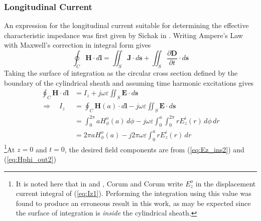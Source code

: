 \subsubsection{Longitudinal Current}
An expression for the longitudinal current suitable for determining the effective characteristic impedance was first given by Sichak in \cite{sichak1}. Writing Ampere's Law with Maxwell's correction in integral form gives
\begin{equation}
	\oint_C \mathbf{H} \cdot d\mathbf{l} = \iint_S \mathbf{J} \cdot d\mathbf{s} + \iint_S \frac{\partial \mathbf{D}}{\partial t} \cdot d\mathbf{s}
\end{equation}
Taking the surface of integration as the circular cross section defined by the boundary of the cylindrical sheath and assuming time harmonic excitations gives
\begin{equation}\label{eq:Iz1}
	\begin{split}
		\oint_C \mathbf{H} \cdot d\mathbf{l} &= I_z + j \omega \varepsilon \iint_S \mathbf{E} \cdot d\mathbf{s} \\
		\Rightarrow \quad I_z &= \oint_C \mathbf{H}(a) \cdot d\mathbf{l} - j \omega \varepsilon \iint_S \mathbf{E} \cdot d\mathbf{s} \\
		&= \int_0^{2\pi} a H_\phi^o(a) \, d\phi - j \omega \varepsilon \int_0^a \int_0^{2\pi} r E_z^i(r) \, d\phi \, dr \\
		&= 2\pi a H_\phi^o(a) - j 2\pi \omega \varepsilon \int_0^a r E_z^i(r) \, dr
	\end{split}
\end{equation}
\footnote{It is noted here that in \cite{corum1} and \cite{corum2}, Corum and Corum write $E_z^o$ in the displacement current integral of (\ref{eq:Iz1}). Performing the integration using this value was found to produce an erroneous result in this work, as may be expected since the surface of integration is \textit{inside} the cylindrical sheath.}At $z=0$ and $t=0$, the desired field components are from (\ref{eq:Ez_ins2}) and (\ref{eq:Hphi_out2})

